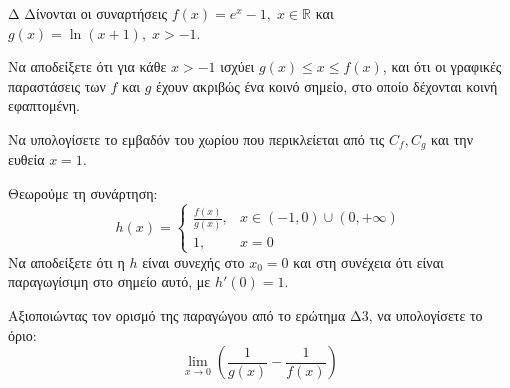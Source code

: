 \begin{thema}{Δ}
Δίνονται οι συναρτήσεις $\displaystyle f(x) = e^x - 1, \; x \in \mathbb{R}$ και $\displaystyle g(x) = \ln(x+1), \; x > -1$.
\begin{erwthma}
    \item Να αποδείξετε ότι για κάθε $x > -1$ ισχύει $g(x) \le x \le f(x)$, και ότι οι γραφικές παραστάσεις των $f$ και $g$ έχουν ακριβώς ένα κοινό σημείο, στο οποίο δέχονται κοινή εφαπτομένη.
    \item Να υπολογίσετε το εμβαδόν του χωρίου που περικλείεται από τις $C_f, C_g$ και την ευθεία $x = 1$.
    \item Θεωρούμε τη συνάρτηση:
    \[ h(x) = \begin{cases} 
        \displaystyle \frac{f(x)}{g(x)}, & x \in (-1, 0) \cup (0, +\infty) \\[2ex]
        1, & x = 0 
    \end{cases} \]
    Να αποδείξετε ότι η $h$ είναι συνεχής στο $x_0 = 0$ και στη συνέχεια ότι είναι παραγωγίσιμη στο σημείο αυτό, με $h'(0) = 1$.
    \item Αξιοποιώντας τον ορισμό της παραγώγου από το ερώτημα Δ3, να υπολογίσετε το όριο:
    \[ \lim_{x \to 0} \left( \frac{1}{g(x)} - \frac{1}{f(x)} \right) \]
\end{erwthma}
\end{thema}
